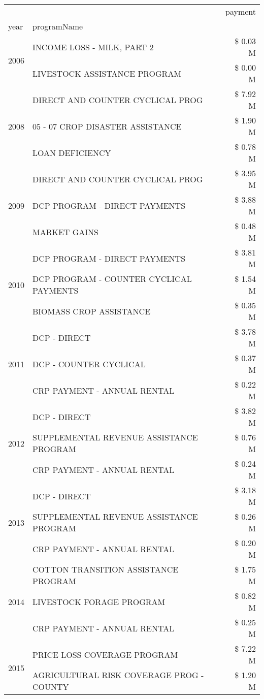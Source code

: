 \begin{tabular}{llr}
\toprule
 &  & payment \\
year & programName &  \\
\midrule
\multirow[t]{2}{*}{2006} & INCOME LOSS - MILK, PART 2 & \$ 0.03 M \\
 & LIVESTOCK ASSISTANCE PROGRAM & \$ 0.00 M \\
\cline{1-3}
\multirow[t]{3}{*}{2008} & DIRECT AND COUNTER CYCLICAL PROG & \$ 7.92 M \\
 & 05 - 07 CROP DISASTER ASSISTANCE & \$ 1.90 M \\
 & LOAN DEFICIENCY & \$ 0.78 M \\
\cline{1-3}
\multirow[t]{3}{*}{2009} & DIRECT AND COUNTER CYCLICAL PROG & \$ 3.95 M \\
 & DCP PROGRAM - DIRECT PAYMENTS & \$ 3.88 M \\
 & MARKET GAINS & \$ 0.48 M \\
\cline{1-3}
\multirow[t]{3}{*}{2010} & DCP PROGRAM - DIRECT PAYMENTS & \$ 3.81 M \\
 & DCP PROGRAM - COUNTER CYCLICAL PAYMENTS & \$ 1.54 M \\
 & BIOMASS CROP ASSISTANCE & \$ 0.35 M \\
\cline{1-3}
\multirow[t]{3}{*}{2011} & DCP - DIRECT & \$ 3.78 M \\
 & DCP - COUNTER CYCLICAL & \$ 0.37 M \\
 & CRP PAYMENT - ANNUAL RENTAL & \$ 0.22 M \\
\cline{1-3}
\multirow[t]{3}{*}{2012} & DCP - DIRECT & \$ 3.82 M \\
 & SUPPLEMENTAL REVENUE ASSISTANCE PROGRAM & \$ 0.76 M \\
 & CRP PAYMENT - ANNUAL RENTAL & \$ 0.24 M \\
\cline{1-3}
\multirow[t]{3}{*}{2013} & DCP - DIRECT & \$ 3.18 M \\
 & SUPPLEMENTAL REVENUE ASSISTANCE PROGRAM & \$ 0.26 M \\
 & CRP PAYMENT - ANNUAL RENTAL & \$ 0.20 M \\
\cline{1-3}
\multirow[t]{3}{*}{2014} & COTTON TRANSITION ASSISTANCE PROGRAM & \$ 1.75 M \\
 & LIVESTOCK FORAGE PROGRAM & \$ 0.82 M \\
 & CRP PAYMENT - ANNUAL RENTAL & \$ 0.25 M \\
\cline{1-3}
\multirow[t]{3}{*}{2015} & PRICE LOSS COVERAGE PROGRAM & \$ 7.22 M \\
 & AGRICULTURAL RISK COVERAGE PROG - COUNTY & \$ 1.20 M \\

\end{tabular}
